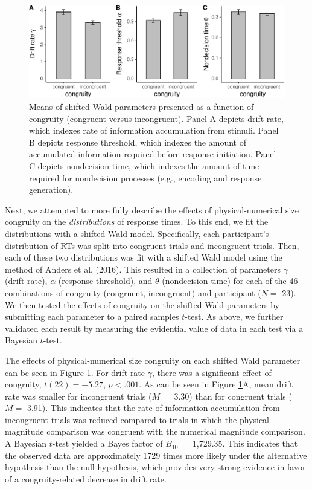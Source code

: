 \documentclass[english,man]{apa6}
\theoremstyle{definition}
\theoremstyle{definition}
\theoremstyle{definition}
\theoremstyle{remark}
\begin{document}
\begin{figure}
\centering
\includegraphics{paper_files/figure-latex/waldModel-1.pdf}
\caption{\label{fig:waldModel}Means of shifted Wald parameters presented as
a function of congruity (congruent versus incongruent). Panel A depicts
drift rate, which indexes rate of information accumulation from stimuli.
Panel B depicts response threshold, which indexes the amount of
accumulated information required before response initiation. Panel C
depicts nondecision time, which indexes the amount of time required for
nondecision processes (e.g., encoding and response generation).}
\end{figure}

Next, we attempted to more fully describe the effects of
physical-numerical size congruity on the \emph{distributions} of
response times. To this end, we fit the distributions with a shifted
Wald model. Specifically, each participant's distribution of RTs was
split into congruent trials and incongruent trials. Then, each of these
two distributions was fit with a shifted Wald model using the method of
Anders et al. (2016). This resulted in a collection of parameters
\(\gamma\) (drift rate), \(\alpha\) (response threshold), and \(\theta\)
(nondecision time) for each of the 46 combinations of congruity
(congruent, incongruent) and participant (\(N=\) 23). We then tested the
effects of congruity on the shifted Wald parameters by submitting each
parameter to a paired samples \(t\)-test. As above, we further validated
each result by measuring the evidential value of data in each test via a
Bayesian \(t\)-test.

The effects of physical-numerical size congruity on each shifted Wald
parameter can be seen in Figure \ref{fig:waldModel}. For drift rate
\(\gamma\), there was a significant effect of congruity,
\(t(22) = -5.27\), \(p < .001\). As can be seen in Figure
\ref{fig:waldModel}A, mean drift rate was smaller for incongruent trials
(\(M=\) 3.30) than for congruent trials (\(M=\) 3.91). This indicates
that the rate of information accumulation from incongruent trials was
reduced compared to trials in which the physical magnitude comparison
was congruent with the numerical magnitude comparison. A Bayesian
\(t\)-test yielded a Bayes factor of \(B_{10}=\) 1,729.35. This
indicates that the observed data are approximately 1729 times more
likely under the alternative hypothesis than the null hypothesis, which
provides very strong evidence in favor of a congruity-related decrease
in drift rate.
\end{document}
